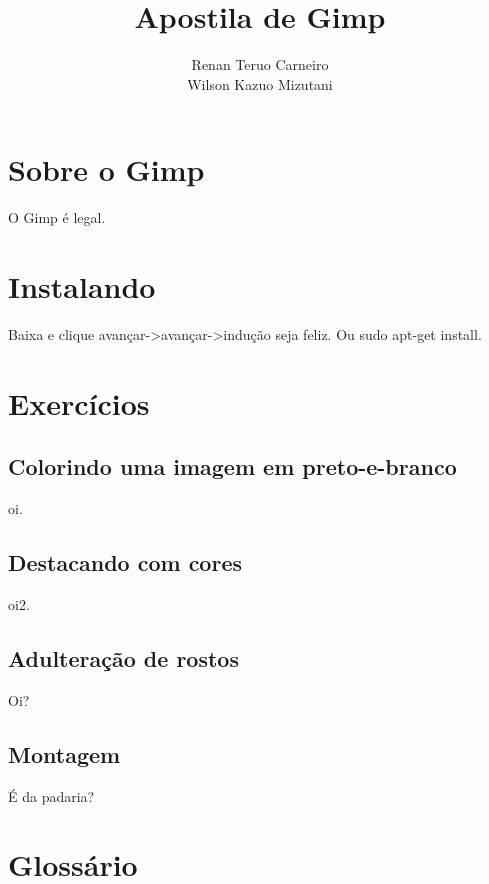 \documentclass[12pt,onecolumn]{article}
\begin{document}
\title{Apostila de Gimp}
\author{Renan Teruo Carneiro \\ Wilson Kazuo Mizutani}
\maketitle

\section{Sobre o Gimp}
  O Gimp é legal.

\section{Instalando}
  Baixa e clique avançar->avançar->indução seja feliz.
  Ou sudo apt-get install.

\section{Exercícios}
  

  \subsection{Colorindo uma imagem em preto-e-branco}
    oi.

  \subsection{Destacando com cores}
    oi2.

  \subsection{Adulteração de rostos}
    Oi?

  \subsection{Montagem}
    É da padaria?

\section{Glossário}
\end{document}
